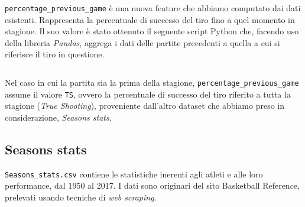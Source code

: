 \texttt{percentage\_previous\_game} è una nuova feature che abbiamo computato dai dati esistenti. Rappresenta la percentuale di successo del tiro fino a quel momento in stagione. Il suo valore è stato ottenuto il seguente script Python che, facendo uso della libreria \textit{Pandas}, aggrega i dati delle partite precedenti a quella a cui si riferisce il tiro in questione.

\begin{code}
\inputminted[breaklines]{python}{../datasets/shot_logs_nv.py}
\end{code}

Nel caso in cui la partita sia la prima della stagione, \texttt{percentage\_previous\_game} assume il valore \texttt{TS}, ovvero la percentuale di successo del tiro riferito a tutta la stagione (\textit{True Shooting}), proveniente dall’altro dataset che abbiamo preso in considerazione, \textit{Seasons stats}.

\subsection{Seasons stats}

\texttt{Seasons\_stats.csv} \cite{season_stats} contiene le statistiche inerenti agli atleti e alle loro performance, dal 1950 al 2017. I dati sono originari del sito Basketball Reference\cite{basketball-reference}, prelevati usando tecniche di \textit{web scraping}.

